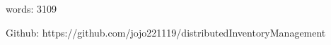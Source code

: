 
\addchap{\langanhang}

words: 3109

Github: https://github.com/jojo221119/distributedInventoryManagement


